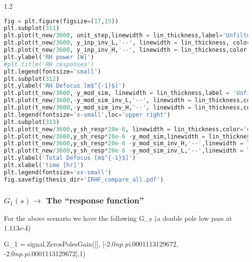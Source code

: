 \begin{spacing}{1.2} \begin{lstlisting}[frame=single,language=Python]
fig = plt.figure(figsize=(17,15))
plt.subplot(311)
plt.plot(t_new/3600, unit_step,linewidth = lin_thickness,label='Unfiltered step input')
plt.plot(t_new/3600, y_inp_inv_L,'--', linewidth = lin_thickness, color = 'green',label='Conditioned input (G$_{1}$(s))')
plt.plot(t_new/3600, y_inp_inv_H,'--', linewidth = lin_thickness,color = 'red', label='Conditioned input (G$_{1}$(s))')
plt.ylabel('RH power [W]')
#plt.title('RH responses')
plt.legend(fontsize='small')
plt.subplot(312)
plt.ylabel('RH Defocus [m$^{-1}$]')
plt.plot(t_new/3600,-y_mod_sim, linewidth = lin_thickness,label = 'Unfiltered step input')
plt.plot(t_new/3600,-y_mod_sim_inv_L,'--', linewidth = lin_thickness,color='green',label ='Conditioned input (G$_{2}$(s))')
plt.plot(t_new/3600,-y_mod_sim_inv_H,'--', linewidth = lin_thickness,color='red',label ='Conditioned input (G$_{1}$(s))')
plt.legend(fontsize='x-small',loc='upper right')
plt.subplot(313)
plt.plot(t_new/3600,y_sh_resp*20e-6, linewidth = lin_thickness,color='orange',label ='Self heating')
plt.plot(t_new/3600,y_sh_resp*20e-6 -y_mod_sim,linewidth = lin_thickness,label='Self heating + RH unfiltered input',color='C0')
plt.plot(t_new/3600,y_sh_resp*20e-6 -y_mod_sim_inv_H,'--',linewidth = lin_thickness,label='Self heating + RH conditioned input (G$_{1}$(s))',color='red')
plt.plot(t_new/3600,y_sh_resp*20e-6 -y_mod_sim_inv_L,'--',linewidth = lin_thickness,label='Self heating + RH conditioned input (G$_{2}$(s))',color='green')
plt.ylabel('Total Defocus [m$^{-1}$]')
plt.xlabel('time [hr]')
plt.legend(fontsize='xx-small')
fig.savefig(thesis_dir+'IRHF_compare_all.pdf')
\end{lstlisting} \end{spacing}


\subsubsection*{\texorpdfstring{$G_{1}(s) \rightarrow$}{G1s} The ``response function''}

\noindent For the above scenario we have the following G\_s (a double pole low pass at 1.113e-4)

\noindent G\_1 = signal.ZerosPolesGain({[}{]}, {[}-2.0\emph{np.pi}.0001113129672, -2.0\emph{np.pi}.0001113129672{]},1) 

